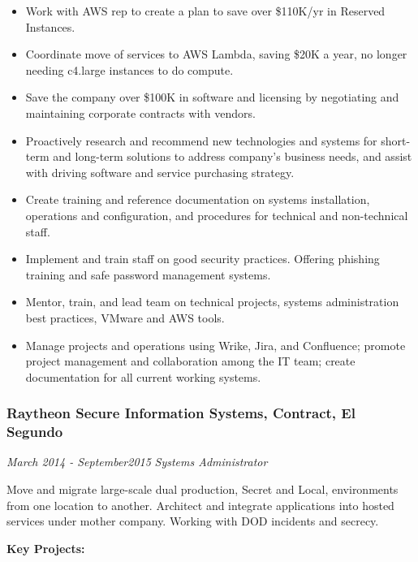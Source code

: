 \documentclass[]{article}
\providecommand{\tightlist}{%
  \setlength{\itemsep}{0pt}\setlength{\parskip}{0pt}}
\begin{document}
\begin{itemize}
\tightlist
\item
  Work with AWS rep to create a plan to save over \$110K/yr in Reserved
  Instances.
\item
  Coordinate move of services to AWS Lambda, saving \$20K a year, no
  longer needing c4.large instances to do compute.
\item
  Save the company over \$100K in software and licensing by negotiating
  and maintaining corporate contracts with vendors.
\item
  Proactively research and recommend new technologies and systems for
  short-term and long-term solutions to address company's business
  needs, and assist with driving software and service purchasing
  strategy.
\item
  Create training and reference documentation on systems installation,
  operations and configuration, and procedures for technical and
  non-technical staff.
\item
  Implement and train staff on good security practices. Offering
  phishing training and safe password management systems.
\item
  Mentor, train, and lead team on technical projects, systems
  administration best practices, VMware and AWS tools.
\item
  Manage projects and operations using Wrike, Jira, and Confluence;
  promote project management and collaboration among the IT team; create
  documentation for all current working systems.
\end{itemize}

\hypertarget{raytheon-secure-information-systems-contract-el-segundo}{%
\subsubsection{Raytheon Secure Information Systems, Contract, El
Segundo}\label{raytheon-secure-information-systems-contract-el-segundo}}

\emph{March 2014 - September2015} \emph{Systems Administrator}

Move and migrate large-scale dual production, Secret and Local,
environments from one location to another. Architect and integrate
applications into hosted services under mother company. Working with DOD
incidents and secrecy.

\textbf{Key Projects:}
\end{document}
